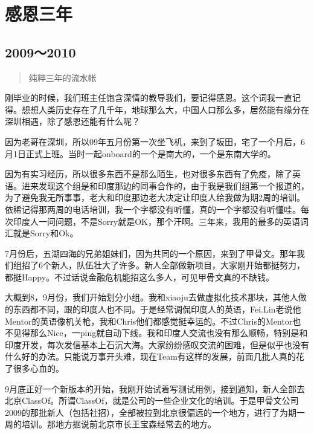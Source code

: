 \chapter{感恩三年}

\section*{2009～2010}

\begin{quote}
    \begin{center}
纯粹三年的流水帐
\end{center}
\end{quote}

刚毕业的时候，我们班主任饱含深情的教导我们，要记得感恩。这个词我一直记得。想想人类历史存在了几千年，地球那么大，中国人口那么多，居然能有缘分在深圳相遇，除了感恩还能有什么呢？

因为老哥在深圳，所以09年五月份第一次坐飞机，来到了坂田，宅了一个月后，6月1日正式上班。当时一起onboard的一个是南大的，一个是东南大学的。

因为有实习经历，所以很多东西不是那么陌生，也对很多东西有了免疫，除了英语。进来发现这个组是和印度那边的同事合作的，由于我是我们组第一个报道的，为了避免我无所事事，老大和印度那边老大决定让印度人给我做为期2周的培训。依稀记得那两周的电话培训，我一个字都没有听懂，真的一个字都没有听懂哇。每次印度人一问问题，不是Sorry就是OK，那个汗啊。三年来，我用的最多的英语词汇就是Sorry和Ok。

7月份后，五湖四海的兄弟姐妹们，因为共同的一个原因，来到了甲骨文。那年我们组招了6个新人，队伍壮大了许多。新人全部做新项目，大家刚开始都挺努力，都挺Happy。不过话说金融危机能招这么多人，可见甲骨文真的不缺钱。

大概到8，9月份，我们开始划分小组。我和xiaoju去做虚拟化技术那块，其他人做的东西都不同，跟的印度人也不同。于是经常调侃印度人的英语，Fei.Lin老说他Mentor的英语像机关枪，我和Chris他们都感觉挺幸运的。不过Chris的Mentor也不见得那么Nice，一ping就自动下线。我和印度人交流也没有那么顺畅，特别是和印度开发，每次发信基本上石沉大海。大家纷纷感叹交流的困难，但是似乎也没有什么好的办法。只能说万事开头难，现在Team有这样的发展，前面几批人真的花了很多心血的。

9月底正好一个新版本的开始，我刚开始试着写测试用例，接到通知，新人全部去北京ClassOf。所谓ClassOf，就是公司的一些企业文化的培训。于是甲骨文公司2009的那批新人（包括社招），全部被拉到北京很偏远的一个地方，进行了为期一周的培训。那地方据说前北京市长王宝森经常去的地方。

